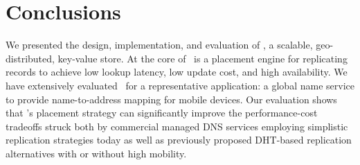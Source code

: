 
\section{Conclusions}

\label{sec:concl}

We presented the design, implementation, and evaluation of \auspice, a scalable, geo-distributed, key-value store. At the core of \auspice\ is a placement engine for replicating  records to achieve low lookup latency, low update cost, and high availability. We have extensively evaluated \auspice\ for a representative application: a global name service to provide name-to-address mapping for mobile devices. Our evaluation shows that \auspice's placement strategy can significantly improve the performance-cost tradeoffs struck both by commercial managed DNS services employing simplistic replication strategies today as well as previously proposed DHT-based replication alternatives with or without high mobility. 
 
 